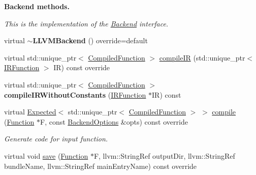 \begin{Indent}\textbf{ Backend methods.}\par
{\em This is the implementation of the \hyperlink{classglow_1_1_backend}{Backend} interface. }\begin{DoxyCompactItemize}
\item 
\mbox{\label{classglow_1_1_l_l_v_m_backend_a4e67d8f160aa174f237b12c5f3d83070}} 
virtual {\bfseries $\sim$\+L\+L\+V\+M\+Backend} () override=default
\item 
virtual std\+::unique\+\_\+ptr$<$ \hyperlink{classglow_1_1_compiled_function}{Compiled\+Function} $>$ \hyperlink{classglow_1_1_l_l_v_m_backend_ae0ce3833434549119195d6b3e4ac6611}{compile\+IR} (std\+::unique\+\_\+ptr$<$ \hyperlink{classglow_1_1_i_r_function}{I\+R\+Function} $>$ IR) const override
\item 
\mbox{\label{classglow_1_1_l_l_v_m_backend_a73f693e336f2e0fc78178c4ac78b69fb}} 
virtual std\+::unique\+\_\+ptr$<$ \hyperlink{classglow_1_1_compiled_function}{Compiled\+Function} $>$ {\bfseries compile\+I\+R\+Without\+Constants} (\hyperlink{classglow_1_1_i_r_function}{I\+R\+Function} $\ast$IR) const
\item 
virtual \hyperlink{classglow_1_1detail_1_1_glow_expected}{Expected}$<$ std\+::unique\+\_\+ptr$<$ \hyperlink{classglow_1_1_compiled_function}{Compiled\+Function} $>$ $>$ \hyperlink{classglow_1_1_l_l_v_m_backend_a914fa04325ef3ba9d345f507795ba3f2}{compile} (\hyperlink{classglow_1_1_function}{Function} $\ast$F, const \hyperlink{structglow_1_1_backend_options}{Backend\+Options} \&opts) const override
\begin{DoxyCompactList}\small\item\em Generate code for input function. \end{DoxyCompactList}\item 
virtual void \hyperlink{classglow_1_1_l_l_v_m_backend_a94aaf63b75e4e711c72aebb4a3c6c173}{save} (\hyperlink{classglow_1_1_function}{Function} $\ast$F, llvm\+::\+String\+Ref output\+Dir, llvm\+::\+String\+Ref bundle\+Name, llvm\+::\+String\+Ref main\+Entry\+Name) const override
\end{DoxyCompactItemize}
\end{Indent}
